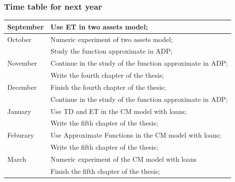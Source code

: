 \documentclass{beamer}
\begin{document}
\begin{frame}
\frametitle{Time table for next year}

\begin{table}

\centering
\begin{tabular}{| l | l |}
\hline
\hline
September & Use ET in two assets model;\\
\hline
October & Numeric experiment of two assets model;\\
& Study the function approximate in ADP;\\
\hline
November & Continue in the study of the function approximate in ADP;\\

& Write the fourth chapter of the thesis;\\
\hline
December & Finish the fourth chapter of the thesis;\\
& Continue in the study of the function approximate in ADP;\\
\hline
January & Use TD and ET in the CM model with loans;\\
& Write the fifth chapter of the thesis;\\
\hline
Feburary & Use Approximate Functions in the CM model with loans;\\
& Write the fifth chapter of the thesis;\\
\hline
March & Numeric experiment of the CM model with loans\\
& Finish the fifth chapter of the thesis;\\
\hline
\end{tabular}
\end{table}
\end{frame}
\end{document}
